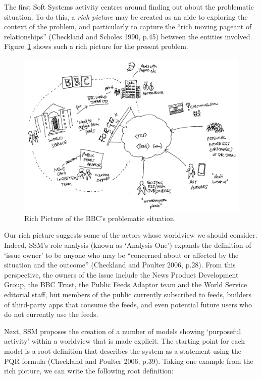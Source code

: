 \documentclass[a4paper]{article}
\begin{document}
The first Soft Systems activity centres around finding out about the problematic situation. To do this, a \textit{rich picture} may be created as an aide to exploring the context of the problem, and particularly to capture the ``rich moving pageant of relationships'' (Checkland and Scholes 1990, p.45) between the entities involved. Figure~\ref{rich-picture} shows such a rich picture for the present problem. 

\begin{figure}
  \includegraphics[width=\textwidth]{richpicture.png}
  \caption{Rich Picture of the BBC's problematic situation}
  \label{rich-picture}
\end{figure}

Our rich picture suggests some of the actors whose worldview we should consider. Indeed, SSM's role analysis (known as `Analysis One') expands the definition of `issue owner' to be anyone who may be ``concerned about or affected by the situation and the outcome'' (Checkland and Poulter 2006, p.28). From this perspective, the owners of the issue include the News Product Development Group, the BBC Trust, the Public Feeds Adaptor team and the World Service editorial staff, but members of the public currently subscribed to feeds, builders of third-party apps that consume the feeds, and even potential future users who do not currently use the feeds.

Next, SSM proposes the creation of a number of models showing `purposeful activity' within a worldview that is made explicit. The starting point for each model is a root definition that describes the system as a statement using the PQR formula (Checkland and Poulter 2006, p.39). Taking one example from the rich picture, we can write the following root definition:
\end{document}
